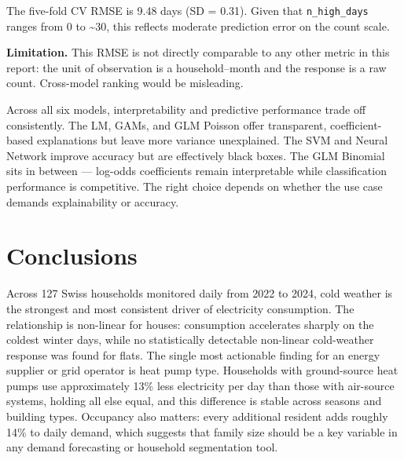 \documentclass[
]{article}
\begin{document}
The five-fold CV RMSE is 9.48 days (SD = 0.31). Given that
\texttt{n\_high\_days} ranges from 0 to \textasciitilde30, this reflects
moderate prediction error on the count scale.

\textbf{Limitation.} This RMSE is not directly comparable to any other
metric in this report: the unit of observation is a household--month and
the response is a raw count. Cross-model ranking would be misleading.

Across all six models, interpretability and predictive performance trade
off consistently. The LM, GAMs, and GLM Poisson offer transparent,
coefficient-based explanations but leave more variance unexplained. The
SVM and Neural Network improve accuracy but are effectively black boxes.
The GLM Binomial sits in between --- log-odds coefficients remain
interpretable while classification performance is competitive. The right
choice depends on whether the use case demands explainability or
accuracy.

\section{Conclusions}\label{conclusions}

Across 127 Swiss households monitored daily from 2022 to 2024, cold
weather is the strongest and most consistent driver of electricity
consumption. The relationship is non-linear for houses: consumption
accelerates sharply on the coldest winter days, while no statistically
detectable non-linear cold-weather response was found for flats. The
single most actionable finding for an energy supplier or grid operator
is heat pump type. Households with ground-source heat pumps use
approximately 13\% less electricity per day than those with air-source
systems, holding all else equal, and this difference is stable across
seasons and building types. Occupancy also matters: every additional
resident adds roughly 14\% to daily demand, which suggests that family
size should be a key variable in any demand forecasting or household
segmentation tool.
\end{document}
